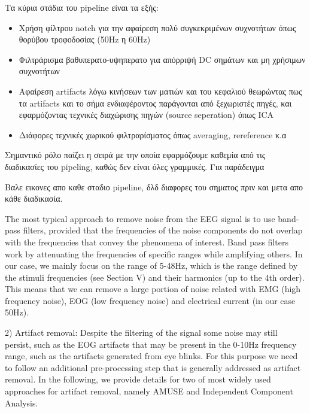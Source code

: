 \documentclass[11pt,a4paper,english,greek,twoside]{../Thesis}
\begin{document}
\par Τα κύρια στάδια του pipeline είναι τα εξής:\\
\begin{itemize}
    \item{Χρήση φίλτρου notch για την αφαίρεση πολύ συγκεκριμένων συχνοτήτων όπως θορύβου τροφοδοσίας (50Hz η 60Hz)}
    \item{Φιλτράρισμα βαθυπερατο-υψηπερατο για απόρριψή DC σημάτων και μη χρήσιμων συχνοτήτων}
    \item{Αφαίρεση artifacts λόγω κινήσεων των ματιών και του κεφαλιού θεωρώντας πως τα artifacts και το σήμα ενδιαφέροντος παράγονται από ξεχωριστές πηγές, και εφαρμόζοντας τεχνικές διαχώρισης πηγών (source seperation) όπως ICA}
    \item{Διάφορες τεχνικές χωρικού φιλτραρίσματος όπως averaging, rereference κ.α}
\end{itemize}

\par Σημαντικό ρόλο παίζει η σειρά με την οποία εφαρμόζουμε καθεμία από τις διαδικασίες του pipeling, καθώς δεν είναι όλες γραμμικές. Για παράδειγμα 
\par Βαλε εικονες απο καθε σταδιο pipeline, δλδ διαφορες του σηματος πριν και μετα απο κάθε διαδικασία.

The most typical approach to remove noise from the EEG signal is to use band-pass filters, provided that
the frequencies of the noise components do not overlap with the frequencies that convey the phenomena
of interest. Band pass filters work by attenuating the frequencies of specific ranges while amplifying
others. In our case, we mainly focus on the range of 5-48Hz, which is the range defined by the stimuli
frequencies (see Section V) and their harmonics (up to the 4th order). This means that we can remove a
large portion of noise related with EMG (high frequency noise), EOG (low frequency noise) and electrical
current (in our case 50Hz).

\par 2) Artifact removal: Despite the filtering of the signal some noise may still persist, such as the EOG
artifacts that may be present in the 0-10Hz frequency range, such as the artifacts generated from eye
blinks. For this purpose we need to follow an additional pre-processing step that is generally addressed as
artifact removal. In the following, we provide details for two of most widely used approaches for artifact
removal, namely AMUSE and Independent Component Analysis.
\end{document}

